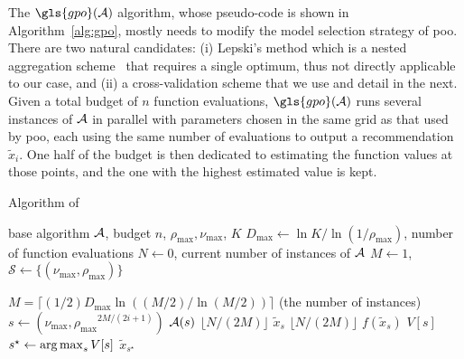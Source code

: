 The $\gls{gpo}(\cA)$ algorithm, whose pseudo-code is shown in Algorithm~\ref{alg:gpo},  mostly needs to modify the model selection strategy of \gls{poo}. There are two natural candidates: (i) Lepski's method which is a nested aggregation scheme~\citep{lepski1992,lepski1997,locatelli2017adaptivity,locatelli2018adaptivity} that requires a single optimum, thus not directly applicable to our case, and (ii) a cross-validation scheme that we use and detail in the next. Given a total budget of $n$ function evaluations, $\gls{gpo}(\cA)$ runs several instances of $\mathcal{A}$ in parallel with parameters chosen in the same grid as that used by \gls{poo}, each using the same number of evaluations to output a recommendation $\tilde{x}_i$. One half of the budget is then dedicated to estimating the function values at those points, and the one with the highest estimated value is kept. 

\begin{algorithm}[ht]
\centering
\caption{Algorithm of \GPO{}}
\label{alg:gpo}
\begin{algorithmic}[1]
     base algorithm $\mathcal{A}$, budget $n$, $\rho_{\max}, \nu_{\max}$, $K$
     $D_{\max} \gets \ln K/\ln\left( 1/\rho_{\max}\right)$, number of function evaluations $N \gets 0$, current number of instances of $\mathcal{A}$ $M \gets 1$, $\mathcal{S} \gets \{(\nu_{\max},\rho_{\max})\}$

    \State {} $M = \lceil (1/2)D_{\max}\ln((M/2)/\ln(M/2))\rceil$ (the number of instances)
    	\State $s \gets \left(\nu_{\max},{\rho_{\max}}^{2M/(2i+1)}\right)$
		\State {} $\mathcal{A}(s)$  $\lfloor N/(2M)\rfloor$ 
		\State {} $\tilde x_s$
		\State {} $\lfloor N/(2M)\rfloor$  $f(\tilde{x}_s)$
		\State {} $V[s]$
	\EndFor
    \State ${s^\star} \gets \operatorname*{arg\,max}_{s} V[s]$
     $\tilde x_{s^\star}$
\end{algorithmic}
\end{algorithm}

